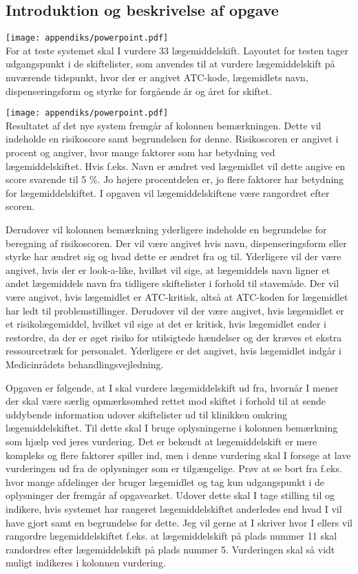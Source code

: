 \subsection{Introduktion og beskrivelse af opgave} \label{App:Intro_OPG}
\vspace{-0.3cm}
\texttt{[image: appendiks/powerpoint.pdf]} \\
For at teste systemet skal I vurdere 33 lægemiddelskift. Layoutet for testen tager udgangspunkt i de skiftelister, som anvendes til at vurdere lægemiddelskift på nuværende tidspunkt, hvor der er angivet ATC-kode, lægemidlets navn, dispenseringsform og styrke for forgående år og året for skiftet.


\texttt{[image: appendiks/powerpoint.pdf]} \\
Resultatet af det nye system fremgår af kolonnen bemærkningen. Dette vil indeholde en risikoscore samt begrundelsen for denne. Risikoscoren er angivet i procent og angiver, hvor mange faktorer som har betydning ved lægemiddelskiftet. Hvis f.eks. Navn er ændret ved lægemidlet vil dette angive en score svarende til 5 \%. Jo højere procentdelen er, jo flere faktorer har betydning for lægemiddelskiftet. I opgaven vil lægemiddelskiftene være rangordret efter scoren.  

Derudover vil kolonnen bemærkning yderligere indeholde en begrundelse for beregning af risikoscoren. Der vil være angivet hvis navn, dispenseringsform eller styrke har ændret sig og hvad dette er ændret fra og til. Yderligere vil der være angivet, hvis der er look-a-like, hvilket vil sige, at lægemiddels navn ligner et andet lægemiddels navn fra tidligere skiftelister i forhold til stavemåde. Der vil være angivet, hvis lægemidlet er ATC-kritisk, altså at ATC-koden for lægemidlet har ledt til problemstillinger. Derudover vil der være angivet, hvis lægemidlet er et risikolægemiddel, hvilket vil sige at det er kritisk, hvis lægemidlet ender i restordre, da der er øget risiko for utilsigtede hændelser og der kræves et ekstra ressourcetræk for personalet. Yderligere er det angivet, hvis lægemidlet indgår i Medicinrådets behandlingsvejledning. 

Opgaven er følgende, at I skal vurdere lægemiddelskift ud fra, hvornår I mener der skal være særlig opmærksomhed rettet mod skiftet i forhold til at sende uddybende information udover skiftelister ud til klinikken omkring lægemiddelskiftet. Til dette skal I bruge oplysningerne i kolonnen bemærkning som hjælp ved jeres vurdering. Det er bekendt at lægemiddelskift er mere kompleks og flere faktorer spiller ind, men i denne vurdering skal I forsøge at lave vurderingen ud fra de oplysninger som er tilgængelige. Prøv at se bort fra f.eks. hvor mange afdelinger der bruger lægemidlet og tag kun udgangspunkt i de oplysninger der fremgår af opgavearket. Udover dette skal I tage stilling til og indikere, hvis systemet har rangeret lægemiddelskiftet anderledes end hvad I vil have gjort samt en begrundelse for dette. Jeg vil gerne at I skriver hvor I ellers vil rangordre lægemiddelskiftet f.eks. at lægemiddelskift på plads nummer 11 skal randordres efter lægemiddelskift på plads nummer 5. Vurderingen skal så vidt muligt indikeres i kolonnen vurdering.

